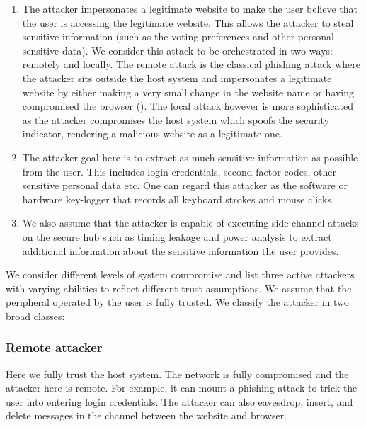 \begin{enumerate}
\item The attacker impersonates a legitimate website to make the user believe
that the user is accessing the legitimate website. This allows the attacker to
steal sensitive information (such as the voting preferences and other personal
sensitive data). We consider this attack to be orchestrated in two ways:
remotely and locally. The remote attack is the classical phishing attack where
the attacker sits outside the host system and impersonates a legitimate website
by either making a very small change in the website name or having compromised
the browser (). The local attack however is more
sophisticated as the attacker compromises the host system which spoofs the
security indicator, rendering a malicious website as a legitimate one.

\item The attacker goal here is to extract as much sensitive information as
possible from the user. This includes login credentials, second factor codes,
other sensitive personal data etc. One can regard this attacker as the software
or hardware key-logger that records all keyboard strokes and mouse clicks.

\item We also assume that the attacker is capable of executing side
channel attacks on the secure hub such as timing leakage and power analysis to
extract additional information about the sensitive information the user
provides.
\end{enumerate}


We consider different levels of system compromise and list three active
attackers with varying abilities to reflect different trust assumptions. We
assume that the peripheral operated by the user is fully trusted. We classify
the attacker in two broad classes:

\subsubsection{Remote attacker}
Here we fully trust the host system. The network is fully compromised and the
attacker here is remote. For example, it can mount a phishing attack to
trick the user into entering login credentials. The attacker can also eavesdrop,
insert, and delete messages in the channel between the website and browser.


